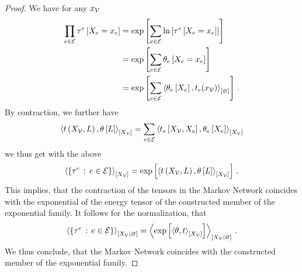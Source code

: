 \begin{proof}
    We have for any $x_{\mathcal{V}}$
    \begin{align*}
        \prod_{e\in\mathcal{E}} \tau^{e}\left[X_{e}=x_{e}\right]
        &= \mathrm{exp}\left[\sum_{e\in\mathcal{E}} \ln \left[ \tau^{e}\left[X_{e}=x_{e}\right] \right]\right] \\
        &= \mathrm{exp}\left[\sum_{e\in\mathcal{E}} \theta_{e}\left[X_{e}=x_{e}\right]\right] \\
        &= \mathrm{exp}\left[\sum_{e\in\mathcal{E}} \left\langle \theta_{e}\left[X_{e}\right],t_{e}(x_{\mathcal{V}})\right\rangle_{\left[ \varnothing \right]}\right]  \, .
    \end{align*}
    By contraction, we further have
    \begin{align*}
        \left\langle t\left(X_{\mathcal{V}},L\right),\theta\left[L\right]\right\rangle_{\left[ X_{\mathcal{V}} \right]}
        = \sum_{e\in\mathcal{E}} \left\langle t_{e}\left[X_{\mathcal{V}},X_{e}\right],\theta_{e}\left[X_{e}\right]\right\rangle_{\left[ X_{\mathcal{V}} \right]}
    \end{align*}
    we thus get with the above
    \begin{align}
        \left\langle \{\tau^{e}\,:\,e\in\mathcal{E}\}\right\rangle_{\left[ X_{\mathcal{V}} \right]}
        = \mathrm{exp}\left[\left\langle t\left(X_{\mathcal{V}},L\right),\theta\left[L\right]\right\rangle_{\left[ X_{\mathcal{V}} \right]}\right] \, .
    \end{align}
    This implies, that the contraction of the tensors in the Markov Network coincides with the exponential of the energy tensor of the constructed member of the exponential family.
    It follows for the normalization, that
    \begin{align}
        \left\langle \{\tau^{e}\,:\,e\in\mathcal{E}\}\right\rangle_{\left[ X_{\mathcal{V}} | \varnothing \right]}
        = \left\langle \mathrm{exp}\left[\left\langle \theta,t\right\rangle_{\left[ X_{\mathcal{V}} \right]}\right]\right\rangle_{\left[ X_{\mathcal{V}} | \varnothing \right]} \, .
    \end{align}
    We thus conclude, that the Markov Network coincides with the constructed member of the exponential family.
\end{proof}

